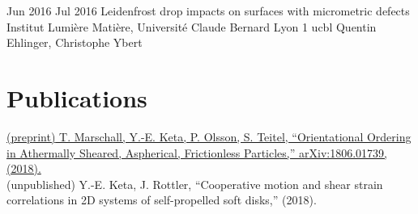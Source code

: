 \documentclass[letterpaper]{cvtemplate_en} %
\begin{document}
\begin{cvbody}
\cvitem
	{Jun 2016}
	{Jul 2016}
	{Leidenfrost drop impacts on surfaces with micrometric defects}
	{Institut Lumi\`ere Mati\`ere, Universit\'e Claude Bernard Lyon 1 }
	{ucbl}
	{Quentin Ehlinger, Christophe Ybert}

\end{cvbody}


\section{Publications}

\href{https://arxiv.org/abs/1806.01739}{{\small (preprint)} T. Marschall, Y.-E. Keta, P. Olsson, S. Teitel, ``Orientational Ordering in Athermally Sheared, Aspherical, Frictionless Particles,'' arXiv:1806.01739, (2018).}\\

{\small (unpublished)} Y.-E. Keta, J. Rottler, ``Cooperative motion and shear strain correlations in 2D systems of self-propelled soft disks,'' (2018).

\end{document}
